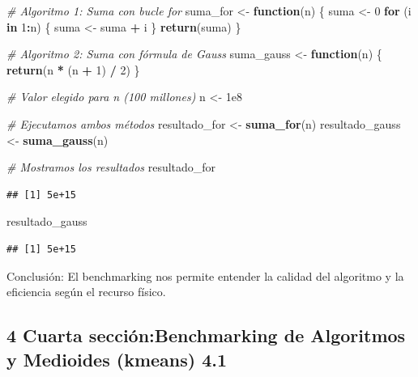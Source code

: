 \documentclass[runningheads]{llncs}
\newenvironment{Shaded}{\begin{snugshade}}{\end{snugshade}}
\newcommand{\CommentTok}[1]{\textcolor[rgb]{0.56,0.35,0.01}{\textit{#1}}}
\newcommand{\ControlFlowTok}[1]{\textcolor[rgb]{0.13,0.29,0.53}{\textbf{#1}}}
\newcommand{\DecValTok}[1]{\textcolor[rgb]{0.00,0.00,0.81}{#1}}
\newcommand{\FloatTok}[1]{\textcolor[rgb]{0.00,0.00,0.81}{#1}}
\newcommand{\FunctionTok}[1]{\textcolor[rgb]{0.13,0.29,0.53}{\textbf{#1}}}
\newcommand{\NormalTok}[1]{#1}
\newcommand{\OtherTok}[1]{\textcolor[rgb]{0.56,0.35,0.01}{#1}}
\newcommand{\SpecialCharTok}[1]{\textcolor[rgb]{0.81,0.36,0.00}{\textbf{#1}}}
\begin{document}
\begin{Shaded}
\begin{Highlighting}[]
\CommentTok{\# Algoritmo 1: Suma con bucle for}
\NormalTok{suma\_for }\OtherTok{\textless{}{-}} \ControlFlowTok{function}\NormalTok{(n) \{}
\NormalTok{  suma }\OtherTok{\textless{}{-}} \DecValTok{0}
  \ControlFlowTok{for}\NormalTok{ (i }\ControlFlowTok{in} \DecValTok{1}\SpecialCharTok{:}\NormalTok{n) \{}
\NormalTok{    suma }\OtherTok{\textless{}{-}}\NormalTok{ suma }\SpecialCharTok{+}\NormalTok{ i}
\NormalTok{  \}}
  \FunctionTok{return}\NormalTok{(suma)}
\NormalTok{\}}

\CommentTok{\# Algoritmo 2: Suma con fórmula de Gauss}
\NormalTok{suma\_gauss }\OtherTok{\textless{}{-}} \ControlFlowTok{function}\NormalTok{(n) \{}
  \FunctionTok{return}\NormalTok{(n }\SpecialCharTok{*}\NormalTok{ (n }\SpecialCharTok{+} \DecValTok{1}\NormalTok{) }\SpecialCharTok{/} \DecValTok{2}\NormalTok{)}
\NormalTok{\}}

\CommentTok{\# Valor elegido para n (100 millones)}
\NormalTok{n }\OtherTok{\textless{}{-}} \FloatTok{1e8}

\CommentTok{\# Ejecutamos ambos métodos}
\NormalTok{resultado\_for }\OtherTok{\textless{}{-}} \FunctionTok{suma\_for}\NormalTok{(n)}
\NormalTok{resultado\_gauss }\OtherTok{\textless{}{-}} \FunctionTok{suma\_gauss}\NormalTok{(n)}

\CommentTok{\# Mostramos los resultados}
\NormalTok{resultado\_for}
\end{Highlighting}
\end{Shaded}

\begin{verbatim}
## [1] 5e+15
\end{verbatim}

\begin{Shaded}
\begin{Highlighting}[]
\NormalTok{resultado\_gauss}
\end{Highlighting}
\end{Shaded}

\begin{verbatim}
## [1] 5e+15
\end{verbatim}

Conclusión: El benchmarking nos permite entender la calidad del
algoritmo y la eficiencia según el recurso físico.

\subsection{4 Cuarta sección:Benchmarking de Algoritmos y Medioides
(kmeans)
4.1}\label{cuarta-secciuxf3nbenchmarking-de-algoritmos-y-medioides-kmeans-4.1}
\end{document}
